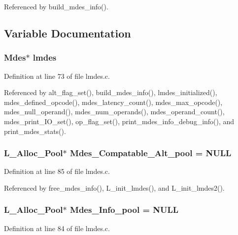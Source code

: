 Referenced by build\_\-mdes\_\-info().

\subsection{Variable Documentation}
\subsubsection{\setlength{\rightskip}{0pt plus 5cm}\bf{Mdes}$\ast$ \bf{lmdes}}\label{lmdes_8c_fccb3150d93023d97c16ad96e4db32dd}




Definition at line 73 of file lmdes.c.

Referenced by alt\_\-flag\_\-set(), build\_\-mdes\_\-info(), lmdes\_\-initialized(), mdes\_\-defined\_\-opcode(), mdes\_\-latency\_\-count(), mdes\_\-max\_\-opcode(), mdes\_\-null\_\-operand(), mdes\_\-num\_\-operands(), mdes\_\-operand\_\-count(), mdes\_\-print\_\-IO\_\-set(), op\_\-flag\_\-set(), print\_\-mdes\_\-info\_\-debug\_\-info(), and print\_\-mdes\_\-stats().
\subsubsection{\setlength{\rightskip}{0pt plus 5cm}\bf{L\_\-Alloc\_\-Pool}$\ast$ \bf{Mdes\_\-Compatable\_\-Alt\_\-pool} = \bf{NULL}\hspace{0.3cm}{\tt  [static]}}\label{lmdes_8c_b5865ba7b34c98e4c0763256bfa17a36}




Definition at line 85 of file lmdes.c.

Referenced by free\_\-mdes\_\-info(), L\_\-init\_\-lmdes(), and L\_\-init\_\-lmdes2().
\subsubsection{\setlength{\rightskip}{0pt plus 5cm}\bf{L\_\-Alloc\_\-Pool}$\ast$ \bf{Mdes\_\-Info\_\-pool} = \bf{NULL}\hspace{0.3cm}{\tt  [static]}}\label{lmdes_8c_5d6fec35dbf5f1069345bbc1cb3030ee}




Definition at line 84 of file lmdes.c.